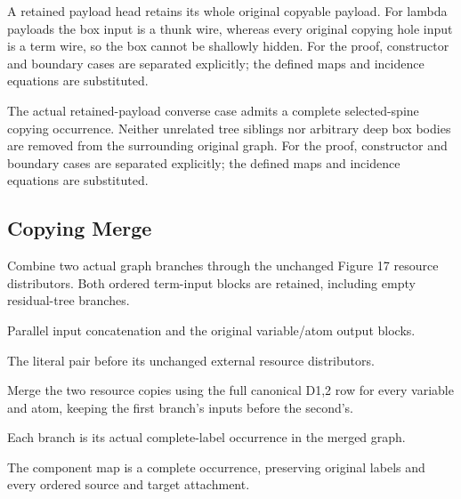 A retained payload head retains its whole original copyable payload. For lambda payloads the box input is a thunk wire, whereas every original copying hole input is a term wire, so the box cannot be shallowly hidden.
For the proof, constructor and boundary cases are separated explicitly; the defined maps and incidence equations are substituted.
\par{}

The actual retained-payload converse case admits a complete selected-spine copying occurrence. Neither unrelated tree siblings nor arbitrary deep box bodies are removed from the surrounding original graph.
For the proof, constructor and boundary cases are separated explicitly; the defined maps and incidence equations are substituted.
\par{}

\subsection{Copying Merge}
Combine two actual graph branches through the unchanged Figure 17 resource distributors. Both ordered term-input blocks are retained, including empty residual-tree branches.

Parallel input concatenation and the original variable/atom output blocks.
\par{}

The literal pair before its unchanged external resource distributors.
\par{}

Merge the two resource copies using the full canonical D1,2 row for every variable and atom, keeping the first branch's inputs before the second's.
\par{}

Each branch is its actual complete-label occurrence in the merged graph.
\par{}

The component map is a complete occurrence, preserving original labels and every ordered source and target attachment.
\par{}

